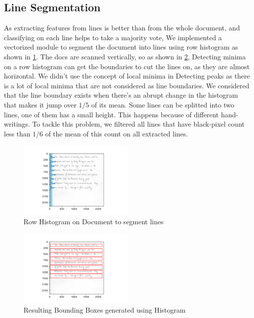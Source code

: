 \subsection{Line Segmentation}
As extracting features from lines is better than from the whole document, and classifying on each line helps to take a majority vote, We implemented a vectorized module to segment the document into lines using row histogram as shown in \ref{fig:histogram}. The docs are scanned vertically, so as shown in \ref{fig:bounding-boxes}, Detecting minima on a row histogram can get the boundaries to cut the lines on, as they are almost horizontal. We didn't use the concept of local minima in Detecting peaks as there is a lot of local minima that are not considered as line boundaries. We considered that the line boundary exists when there's an abrupt change in the histogram that makes it jump over $1/5$ of its mean. Some lines can be splitted into two lines, one of them has a small height. This happens because of different hand-writings. To tackle this problem, we filtered all lines that have black-pixel count less than $1/6$ of the mean of this count on all extracted lines. 

\begin{figure}[h!]
    \centering
    \includegraphics[width=0.5\textwidth]{images/histo.png}
    \caption{Row Histogram on Document to segment lines}
    \label{fig:histogram}
\end{figure}

\begin{figure}[h!]
    \centering
    \includegraphics[width=0.5\textwidth]{images/BB.png}
    \caption{Resulting Bounding Boxes generated using Histogram}
    \label{fig:bounding-boxes}
\end{figure}

